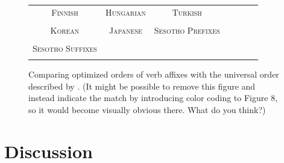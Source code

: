\documentclass[11pt,letterpaper]{article}
\newcommand{\citep}{\parencite}
\newcommand\mhahn[1]{{\color{red}(#1)}}
\begin{document}
\begin{figure}
\begin{tabular}{ccccccc}
\textsc{Finnish} & \textsc{Hungarian} & \textsc{Turkish} \\
\begin{minipage}{.3\textwidth}
  
    \end{minipage}
    &
    \begin{minipage}{.3\textwidth}
  
    \end{minipage}
        &
    \begin{minipage}{.3\textwidth}
  
    \end{minipage} 
    \\
    \textsc{Korean} & \textsc{Japanese} & \textsc{Sesotho Prefixes} \\
        \begin{minipage}{.3\textwidth}
  
    \end{minipage}
    &
    \begin{minipage}{.3\textwidth}
  
    \end{minipage}
        &
    \begin{minipage}{.3\textwidth}
  
    \end{minipage}
    \\
    \textsc{Sesotho Suffixes} \\
        \begin{minipage}{.3\textwidth}
  
    \end{minipage}
\end{tabular}
    \caption{Comparing optimized orders of verb affixes with the universal order described by \citep{bybee-morphology-1985}. \mhahn{It might be possible to remove this figure and instead indicate the match by introducing color coding to Figure 8, so it would become visually obvious there. What do you think?}}
    \label{fig:optimized_and_universal_orders}
\end{figure}


\section{Discussion}
\end{document}
